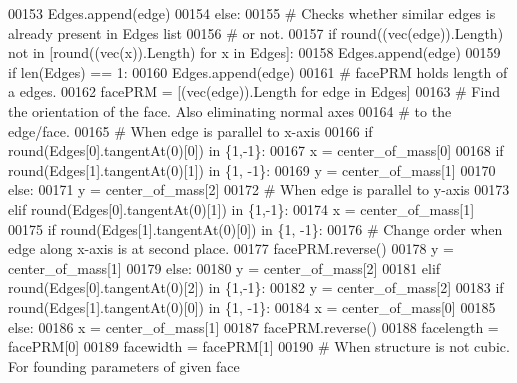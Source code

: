 \begin{DoxyCode}
00153                 Edges.append(edge)
00154             \textcolor{keywordflow}{else}:
00155                 \textcolor{comment}{# Checks whether similar edges is already present in Edges list}
00156                 \textcolor{comment}{# or not.}
00157                 \textcolor{keywordflow}{if} round((vec(edge)).Length) \textcolor{keywordflow}{not} \textcolor{keywordflow}{in} [round((vec(x)).Length) \textcolor{keywordflow}{for} x \textcolor{keywordflow}{in} Edges]:
00158                     Edges.append(edge)
00159         \textcolor{keywordflow}{if} len(Edges) == 1:
00160             Edges.append(edge)
00161         \textcolor{comment}{# facePRM holds length of a edges.}
00162         facePRM = [(vec(edge)).Length \textcolor{keywordflow}{for} edge \textcolor{keywordflow}{in} Edges]
00163         \textcolor{comment}{# Find the orientation of the face. Also eliminating normal axes}
00164         \textcolor{comment}{# to the edge/face.}
00165         \textcolor{comment}{# When edge is parallel to x-axis}
00166         \textcolor{keywordflow}{if} round(Edges[0].tangentAt(0)[0]) \textcolor{keywordflow}{in} \{1,-1\}:
00167             x = center\_of\_mass[0]
00168             \textcolor{keywordflow}{if} round(Edges[1].tangentAt(0)[1]) \textcolor{keywordflow}{in} \{1, -1\}:
00169                 y = center\_of\_mass[1]
00170             \textcolor{keywordflow}{else}:
00171                 y = center\_of\_mass[2]
00172         \textcolor{comment}{# When edge is parallel to y-axis}
00173         \textcolor{keywordflow}{elif} round(Edges[0].tangentAt(0)[1]) \textcolor{keywordflow}{in} \{1,-1\}:
00174             x = center\_of\_mass[1]
00175             \textcolor{keywordflow}{if} round(Edges[1].tangentAt(0)[0]) \textcolor{keywordflow}{in} \{1, -1\}:
00176                 \textcolor{comment}{# Change order when edge along x-axis is at second place.}
00177                 facePRM.reverse()
00178                 y = center\_of\_mass[1]
00179             \textcolor{keywordflow}{else}:
00180                 y = center\_of\_mass[2]
00181         \textcolor{keywordflow}{elif} round(Edges[0].tangentAt(0)[2]) \textcolor{keywordflow}{in} \{1,-1\}:
00182             y = center\_of\_mass[2]
00183             \textcolor{keywordflow}{if} round(Edges[1].tangentAt(0)[0]) \textcolor{keywordflow}{in} \{1, -1\}:
00184                 x = center\_of\_mass[0]
00185             \textcolor{keywordflow}{else}:
00186                 x = center\_of\_mass[1]
00187             facePRM.reverse()
00188         facelength = facePRM[0]
00189         facewidth = facePRM[1]
00190     \textcolor{comment}{# When structure is not cubic. For founding parameters of given face}

\end{DoxyCode}
